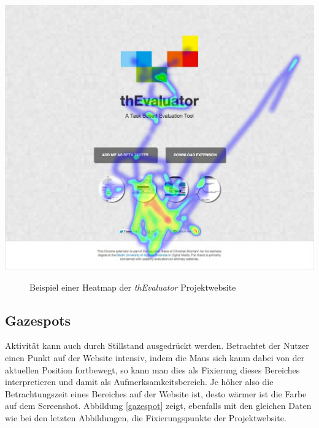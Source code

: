 \vspace{0.3cm}
\begin{center}
\includegraphics[scale=0.35]{./images/heatmap}
\end{center}
\begin{figure}[htb]
   \centering
   \caption{Beispiel einer Heatmap der \textit{thEvaluator} Projektwebsite}
    \label{heatmap}
\end{figure}


\subsection{Gazespots}

Aktivität kann auch durch Stillstand ausgedrückt werden. Betrachtet der Nutzer einen Punkt auf der Website intensiv, indem die Maus sich kaum dabei von der aktuellen Position fortbewegt, so kann man dies als Fixierung dieses Bereiches interpretieren und damit als Aufmerksamkeitsbereich. Je höher also die Betrachtungszeit eines Bereiches auf der Website ist, desto wärmer ist die Farbe auf dem Screenshot. Abbildung \ref{gazespot} zeigt, ebenfalls mit den gleichen Daten wie bei den letzten Abbildungen, die Fixierungspunkte der Projektwebsite.

